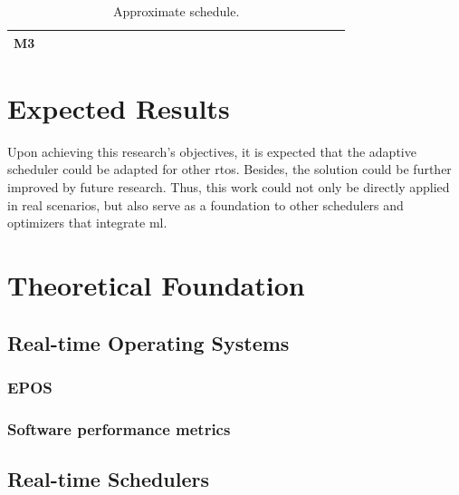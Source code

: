 \documentclass[journal,onecolumn]{IEEEtran}
\begin{document}
\begin{table}[ht]
\begin{tabular}{|l|llllll|llllll|llllll|llllll|}
M3   &                          &                          &                          &                          &                          &                          &                          &                          &                          &                          &                          &                          &                          &                          &                          &                          &                          &                          &                          &                          &                          &                          & \cellcolor[HTML]{7AA2F7} &  \\ \hline
\end{tabular}
\caption{Approximate schedule.}
\label{tab:schedule}
\end{table}

\section{Expected Results}

Upon achieving this research's objectives, it is expected that the adaptive scheduler could be adapted for other \gls{rtos}. Besides, the solution could be further improved by future research. Thus, this work could not only be directly applied in real scenarios, but also serve as a foundation to other schedulers and optimizers that integrate \gls{ml}.

\section{Theoretical Foundation}

\subsection{Real-time Operating Systems}

\subsubsection{EPOS}

\subsubsection{Software performance metrics}

\subsection{Real-time Schedulers}
\end{document}
